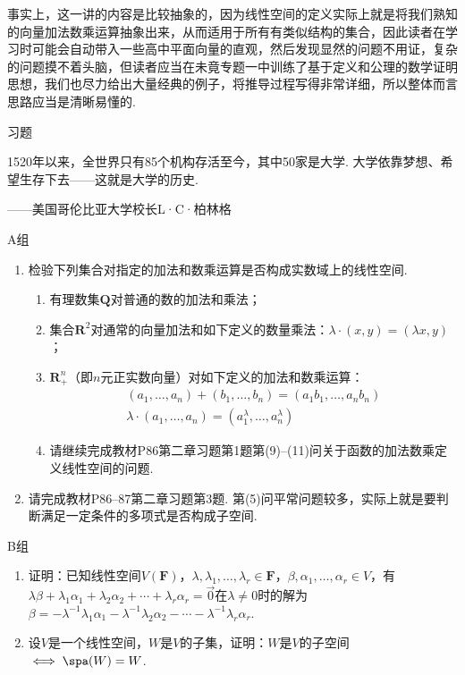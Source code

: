 事实上，这一讲的内容是比较抽象的，因为线性空间的定义实际上就是将我们熟知的向量加法数乘运算抽象出来，从而适用于所有有类似结构的集合，因此读者在学习时可能会自动带入一些高中平面向量的直观，然后发现显然的问题不用证，复杂的问题摸不着头脑，但读者应当在未竟专题一中训练了基于定义和公理的数学证明思想，我们也尽力给出大量经典的例子，将推导过程写得非常详细，所以整体而言思路应当是清晰易懂的.

\vspace{2ex}
\centerline{\heiti \Large 习题}

\vspace{2ex}
{\kaishu 1520年以来，全世界只有85个机构存活至今，其中50家是大学. 大学依靠梦想、希望生存下去——这就是大学的历史.}
\begin{flushright}
    \kaishu
    ——美国哥伦比亚大学校长L·C·柏林格
\end{flushright}

\centerline{\heiti A组}
\begin{enumerate}
    \item 检验下列集合对指定的加法和数乘运算是否构成实数域上的线性空间.
          \begin{enumerate}
              \item 有理数集$\mathbf{Q}$对普通的数的加法和乘法；

              \item 集合$\mathbf{R}^2$对通常的向量加法和如下定义的数量乘法：$\lambda\cdot(x,y)=(\lambda x,y)$；

              \item $\mathbf{R}_+^n$（即$n$元正实数向量）对如下定义的加法和数乘运算：
                    \begin{gather*}
                        (a_1,\ldots,a_n)+(b_1,\ldots,b_n)=(a_1b_1,\ldots,a_nb_n) \\
                        \lambda\cdot(a_1,\ldots,a_n)=(a_1^\lambda,\ldots,a_n^\lambda)
                    \end{gather*}

              \item 请继续完成教材P86第二章习题第1题第(9)--(11)问关于函数的加法数乘定义线性空间的问题.
          \end{enumerate}

    \item 请完成教材P86--87第二章习题第3题. 第(5)问平常问题较多，实际上就是要判断满足一定条件的多项式是否构成子空间.
\end{enumerate}

\centerline{\heiti B组}
\begin{enumerate}
    \item 证明：已知线性空间$V(\mathbf{F})$，$\lambda,\lambda_1,\ldots,\lambda_r\in\mathbf{F}$，$\beta,\alpha_1,\ldots,\alpha_r\in V$，有$\lambda\beta+\lambda_1\alpha_1+\lambda_2\alpha_2+\cdots+\lambda_r\alpha_r=\vec{0}$在$\lambda\neq 0$时的解为$\beta=-\lambda^{-1}\lambda_1\alpha_1-\lambda^{-1}\lambda_2\alpha_2-\cdots-\lambda^{-1}\lambda_r\alpha_r$.

    \item 设$V$是一个线性空间，$W$是$V$的子集，证明：$W$是$V$的子空间$\iff \spa(W)=W$.
\end{enumerate}

